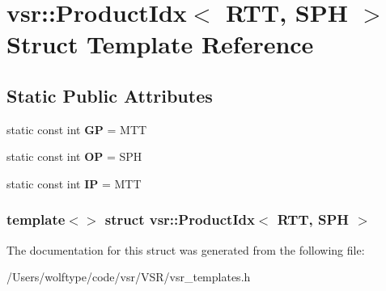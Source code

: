 \hypertarget{structvsr_1_1_product_idx_3_01_r_t_t_00_01_s_p_h_01_4}{\section{vsr\-:\-:Product\-Idx$<$ R\-T\-T, S\-P\-H $>$ Struct Template Reference}
\label{structvsr_1_1_product_idx_3_01_r_t_t_00_01_s_p_h_01_4}
}
\subsection*{Static Public Attributes}
\begin{DoxyCompactItemize}
\item 
\hypertarget{structvsr_1_1_product_idx_3_01_r_t_t_00_01_s_p_h_01_4_a413e93881c5edd2593302253e3f3d6a2}{static const int {\bfseries G\-P} = M\-T\-T}\label{structvsr_1_1_product_idx_3_01_r_t_t_00_01_s_p_h_01_4_a413e93881c5edd2593302253e3f3d6a2}

\item 
\hypertarget{structvsr_1_1_product_idx_3_01_r_t_t_00_01_s_p_h_01_4_a366481ea82719204d90850da38e98a51}{static const int {\bfseries O\-P} = S\-P\-H}\label{structvsr_1_1_product_idx_3_01_r_t_t_00_01_s_p_h_01_4_a366481ea82719204d90850da38e98a51}

\item 
\hypertarget{structvsr_1_1_product_idx_3_01_r_t_t_00_01_s_p_h_01_4_aa69803d813e4dd39004972863c742828}{static const int {\bfseries I\-P} = M\-T\-T}\label{structvsr_1_1_product_idx_3_01_r_t_t_00_01_s_p_h_01_4_aa69803d813e4dd39004972863c742828}

\end{DoxyCompactItemize}
\subsubsection*{template$<$$>$ struct vsr\-::\-Product\-Idx$<$ R\-T\-T, S\-P\-H $>$}



The documentation for this struct was generated from the following file\-:\begin{DoxyCompactItemize}
\item 
/\-Users/wolftype/code/vsr/\-V\-S\-R/vsr\-\_\-templates.\-h\end{DoxyCompactItemize}
